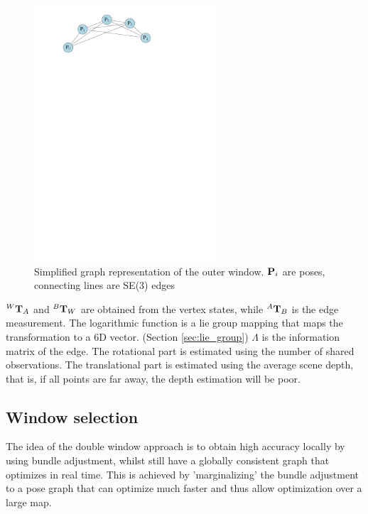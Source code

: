 \begin{figure}[h!]
  \centering
    \includegraphics[width=0.6\textwidth]{chapters/images/outer_window}
  \caption{Simplified graph representation of the outer window.  $\mathbf P_i$ are poses, connecting lines are SE(3) edges}
  \label{fig:outer_window}
\end{figure}

$^{W}\mathbf T_{A}$ and $^{B} \mathbf T_{W}$ are obtained from the vertex states, while $^{A} \mathbf T_{B}$ is the edge measurement.  The logarithmic function is a lie group mapping that maps the transformation to a 6D vector. (Section \ref{sec:lie_group})  $\Lambda$ is the information matrix of the edge.  The rotational part is estimated using the number of shared observations.  The translational part is estimated using the average scene depth, that is, if all points are far away, the depth estimation will be poor.

\subsection{Window selection}

The idea of the double window approach is to obtain high accuracy locally by using bundle adjustment, whilst still have a globally consistent graph that optimizes in real time.  This is achieved by 'marginalizing' the bundle adjustment to a pose graph that can optimize much faster and thus allow optimization over a large map.


